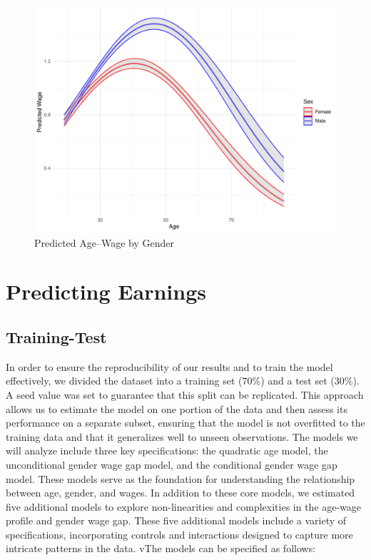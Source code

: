 \documentclass[11pt,a4paper,onecolumn]{article}
\begin{document}
        \begin{figure}[H]
            \includegraphics[scale=0.6]{../views/P6_age_wage_sex_profile.pdf}   
            \caption{Predicted Age--Wage  by Gender} \label{fig:P6}
        \end{figure}



\section{Predicting Earnings}

   \subsection{Training-Test}

        In order to ensure the reproducibility of our results and to train the model effectively, we divided the dataset into a training set (70\%) and a test set (30\%). A seed value was set to guarantee that this split can be replicated. This approach allows us to estimate the model on one portion of the data and then assess its performance on a separate subset, ensuring that the model is not overfitted to the training data and that it generalizes well to unseen observations. The models we will analyze include three key specifications: the quadratic age model, the unconditional gender wage gap model, and the conditional gender wage gap model. These models serve as the foundation for understanding the relationship between age, gender, and wages. In addition to these core models, we estimated five additional models to explore non-linearities and complexities in the age-wage profile and gender wage gap. These five additional models include a variety of specifications, incorporating controls and interactions designed to capture more intricate patterns in the data. vThe models can be specified as follows:
        
\end{document}

